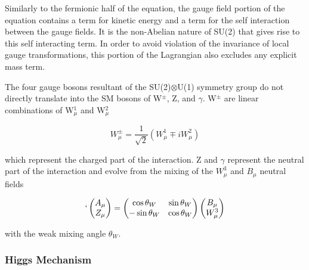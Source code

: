 \documentclass[12pt,a4paper,epsf,portrait,times,epsfig]{report}
\begin{document}
		Similarly to the fermionic half of the equation, the gauge field portion of the equation contains a term for kinetic energy and a term for the self interaction between the gauge fields. It is the non-Abelian nature of SU(2) that gives rise to this self interacting term. In order to avoid violation of the invariance of local gauge transformations, this portion of the Lagrangian also excludes any explicit mass term. \par
		
		The four gauge bosons resultant of the SU(2)$ \otimes$U(1) symmetry group do not directly translate into the SM bosons of W$^{\pm}$, Z, and $\gamma$. W$^{\pm}$ are linear combinations of W$_{\mu}^{1}$ and W$_{\mu}^{2}$
		
		\begin{center}
			\begin{equation}
				W_{\mu}^{\pm} = \frac{1}{\sqrt{2}}(W_{\mu}^{1}\mp iW_{\mu}^{2})
			\end{equation}
		\end{center}
	
		which represent the charged part of the interaction. Z and $\gamma$ represent the neutral part of the interaction and evolve from the mixing of the $W_{\mu}^{3}$ and $B_{\mu}$ neutral fields
		
		\begin{align}
		\begin{split}`
			\begin{pmatrix}
				A_{\mu}  \\
				Z_{\mu}  \\
			\end{pmatrix}=\begin{pmatrix}
				\cos \theta_{W}  & \sin \theta_{W} \\
				-\sin \theta_{W} & \cos \theta_{W} \\
			\end{pmatrix} \begin{pmatrix}
				B_{\mu} \\
				W_{\mu}^{3} \\
			\end{pmatrix}
		\end{split}
		\end{align}	
		
		with the weak mixing angle $\theta_{W}$. 
		
		\subsubsection{Higgs Mechanism}
		
\end{document}
